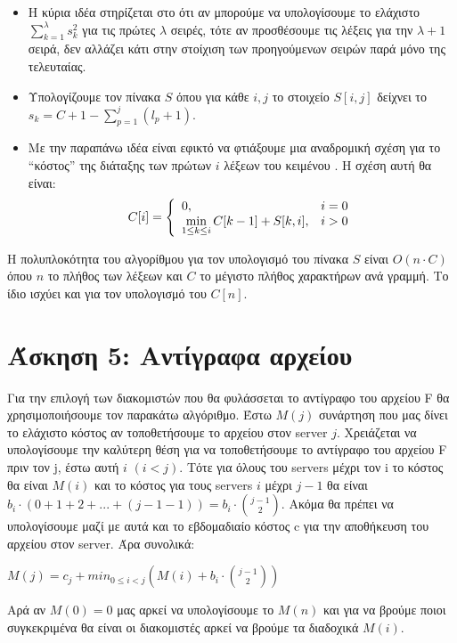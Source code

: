 \documentclass[a4paper,12pt]{report}
\begin{document}
\begin{itemize}
 \item Η κύρια ιδέα στηρίζεται στο ότι αν μπορούμε να υπολογίσουμε το ελάχιστο $\sum_{k=1}^{\lambda}{s_k^2}$ για τις πρώτες $\lambda$ σειρές, τότε αν προσθέσουμε τις λέξεις για την $\lambda+1$ σειρά, δεν αλλάζει κάτι στην στοίχιση των προηγούμενων σειρών παρά μόνο της τελευταίας.
 \item Υπολογίζουμε τον πίνακα $S$ όπου για κάθε $i,j$ το στοιχείο $S[i,j]$ δείχνει το $s_k=C+1-\sum_{p=1}^{j}{(l_p+1)}$.
 \item Με την παραπάνω ιδέα είναι εφικτό να φτιάξουμε μια αναδρομική σχέση για το ``κόστος'' της διάταξης των πρώτων $i$ λέξεων του κειμένου . Η σχέση αυτή θα είναι:
  $$
   C[i]=\left\{\begin{array}{l l}
           0, & i=0 \\
	  \displaystyle \min_{1 \leq k \leq i}C[k-1]+S[k,i], & i>0
          \end{array} \right.
  $$ 

\end{itemize}


H πολυπλοκότητα του αλγορίθμου για τον υπολογισμό του πίνακα $S$ είναι $O(n \cdot C)$ όπου $n$ το πλήθος των λέξεων και $C$ το μέγιστο πλήθος χαρακτήρων ανά γραμμή. Το ίδιο ισχύει και για τον υπολογισμό του $C[n]$.

\section*{Άσκηση 5: Αντίγραφα αρχείου}
Για την επιλογή των διακομιστών που θα φυλάσσεται το αντίγραφο του αρχείου F θα χρησιμοποιήσουμε τον παρακάτω αλγόριθμο. Έστω $M(j)$ συνάρτηση που μας δίνει το ελάχιστο κόστος αν τοποθετήσουμε το αρχείου στον server $j$. Χρειάζεται να υπολογίσουμε την καλύτερη θέση για να τοποθετήσουμε το αντίγραφο του αρχείου F πριν τον j, έστω αυτή $i$ $(i<j)$. Τότε για όλους του servers μέχρι τον i το κόστος θα είναι $M(i)$ και το κόστος για τους  servers $i$ μέχρι $j-1$ θα είναι $b_i \cdot (0+1+2+...+(j-1-1)) = b_i \cdot \binom {j-1}{2} $. Ακόμα θα πρέπει να υπολογίσουμε μαζί με αυτά και το εβδομαδιαίο κόστος c για την αποθήκευση του αρχείου στον server. Άρα συνολικά:
\begin{center}
 $M(j)=c_j + min_{0 \leq i<j}(M(i)+b_i \cdot \binom {j-1}{2})$
\end{center}

Αρά αν $M(0)=0$ μας αρκεί να υπολογίσουμε το $M(n)$ και για να βρούμε ποιοι συγκεκριμένα θα είναι οι διακομιστές αρκεί να βρούμε τα διαδοχικά $M(i)$. 
\end{document}
